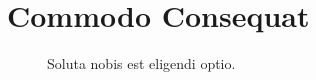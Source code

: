 
%
%


\chapter{Commodo Consequat}
\label{ch:commodo}

\begin{figure}[htb]
  \centering
  \caption{Soluta nobis est eligendi optio.}
  \label{fig:soluta-nobis}
\end{figure}

